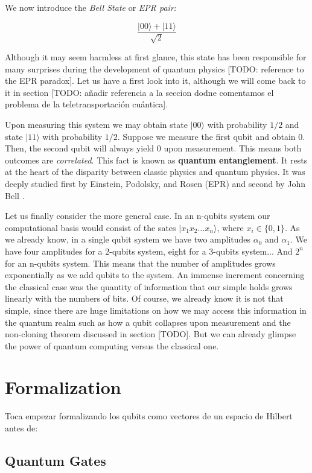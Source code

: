 We now introduce the \emph{Bell State} or \emph{EPR pair:}

$$ \frac{ |00\rangle + |11\rangle }{ \sqrt 2 } $$

Although it may seem harmless at first glance, this state has been responsible for many surprises during the development of quantum physics [TODO: reference to the EPR paradox]. Let us have a first look into it, although we will come back to it in section [TODO: añadir referencia a la seccion dodne comentamos el problema de la teletransportación cuántica].

Upon measuring this system we may obtain state $|00\rangle$ with probability $1/2$ and state $|11\rangle$ with probability $1/2$. Suppose we measure the first qubit and obtain $0$. Then, the second qubit will always yield $0$ upon measurement. This means both outcomes are \emph{correlated}. This fact is known as \textbf{quantum entanglement}. It rests at the heart of the disparity between classic physics and quantum physics. It was deeply studied first by Einstein, Podolsky, and Rosen (EPR) \cite{Einstein1935} and second by John Bell \cite{Bellt1964}.

Let us finally consider the more general case. In an n-qubits system our computational basis would consist of the sates $|x_1 x_2 \dotsc x_n\rangle$, where $x_i \in \{0,1\}$. As we already know, in a single qubit system we have two amplitudes $\alpha_0$ and $\alpha_1$. We have four amplitudes for a 2-qubits system, eight for a 3-qubits system... And $2^n$ for an n-qubits system. This means that the number of amplitudes grows exponentially as we add qubits to the system. An immense increment concerning the classical case was the quantity of information that our simple holds grows linearly with the numbers of bits. Of course, we already know it is not that simple, since there are huge limitations on how we may access this information in the quantum realm such as how a qubit collapses upon measurement and the non-cloning theorem discussed in section [TODO]. But we can already glimpse the power of quantum computing versus the classical one.

\section{Formalization }

Toca empezar formalizando los qubits como vectores de un espacio de Hilbert antes de:

\subsection{Quantum Gates}

